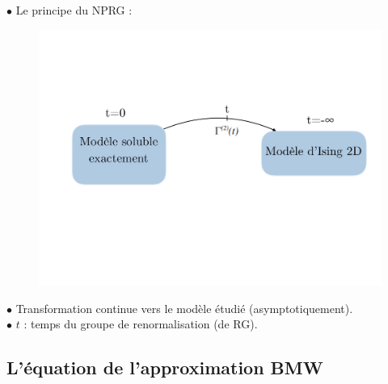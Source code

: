 \documentclass[9pt]{beamer}
\begin{document}
	\begin{frame}
		\justifying
		\vspace*{22pt}
		
		$\bullet$ Le principe du NPRG : 
		
	\begin{figure}[H]
	\begin{center}
		\includegraphics[scale = 0.35]{SchemaRG2.pdf}
	\label{fig:schemaIsing}
	\end{center}
	\end{figure}
	
	$\bullet$ Transformation continue vers le modèle étudié (asymptotiquement).\\ 
$\bullet$ $t$ : temps du groupe de renormalisation (de RG).
  \end{frame}


\subsection{L'équation de l'approximation BMW}
\end{document}
